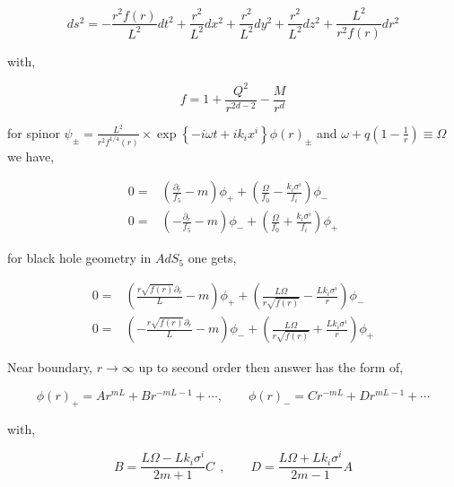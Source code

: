 \begin{equation}
   ds^2 = -\frac{r^2f(r)}{L^2}dt^2 + \frac{r^2}{L^2}dx^2 + \frac{r^2}{L^2}dy^2 + \frac{r^2}{L^2}dz^2 + \frac{L^2}{r^2f(r)}dr^2 
\end{equation}

with,

\begin{equation}
   f = 1 + \frac{Q^2}{r^{2d-2}} - \frac{M}{r^d}
\end{equation}

for spinor $\psi_{\pm} = \frac{L^2}{r^2f^{1/4}(r)}\times\exp\left\{-i\omega t +ik_ix^i\right\}\phi(r)_{\pm}$ and $\omega + q(1-\frac{1}{r}) \equiv \Omega$  we have,

\begin{align}
    0 =& \left( \frac{\partial_r}{f_5} - m \right) \phi_{+} + \left( \frac{\Omega}{f_0} - \frac{k_i\sigma^i}{f_i} \right) \phi_{-} \nonumber\\
    0 =& \left( - \frac{\partial_r}{f_5} - m \right) \phi_{-} + \left( \frac{\Omega}{f_0} + \frac{k_i\sigma^i}{f_i} \right) \phi_{+}
\end{align}

for black hole geometry in $AdS_5$ one gets,

\begin{align}
    0 =& \left( \frac{r\sqrt{f(r)}\partial_r}{L} - m \right) \phi_{+} + \left( \frac{L\Omega}{r\sqrt{f(r)}} - \frac{Lk_i\sigma^i}{r} \right) \phi_{-} \nonumber\\
    0 =& \left(-\frac{r\sqrt{f(r)}\partial_r}{L} - m \right) \phi_{-} + \left( \frac{L\Omega}{r\sqrt{f(r)}} + \frac{Lk_i\sigma^i}{r} \right) \phi_{+}
\end{align}

Near boundary, $r\rightarrow\infty$ up to second order then answer has the form of,

\begin{equation}
   \phi(r)_{+} = Ar^{mL} + Br^{-mL-1} + \cdots, \qquad \phi(r)_{-} = Cr^{-mL} + Dr^{mL-1} + \cdots
\end{equation}

with,

\begin{equation}
   B = \frac{L\Omega - Lk_i\sigma^i}{2m + 1}C ~~, \qquad D = \frac{L\Omega + Lk_i\sigma^i}{2m-1}A
\end{equation}
